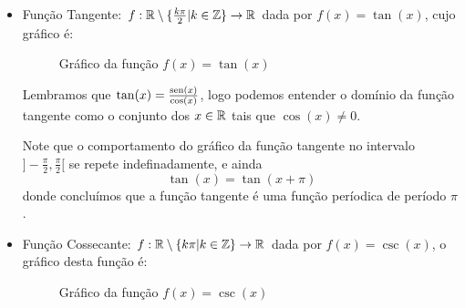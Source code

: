 \begin{itemize}
  \item Função Tangente: $f: \mathbb{R} \setminus \{\frac{k\pi}{2} | k \in \mathbb{Z}\} \rightarrow \mathbb{R}$ dada por $f(x)= \tan(x)$, cujo gráfico é:

  \begin{figure}[H]
  \centering
    \caption{Gráfico da função $f(x)= \tan (x)$}
  \end{figure}

  Lembramos que $\tan(x)= \frac{\operatorname{sen}(x)}{\cos(x)}$, logo podemos entender o domínio da função tangente como o conjunto dos $x \in \mathbb{R}$ tais que $\cos(x) \neq 0$.

  Note que o comportamento do gráfico da função tangente no intervalo $]-\frac{\pi}{2}, \frac{\pi}{2}[$ se repete indefinadamente, e ainda
\begin{equation}
\tan(x)= \tan(x + \pi)
\end{equation}
  donde concluímos que a função tangente é uma função períodica de período $\pi$.

  \item Função Cossecante: $f: \mathbb{R} \setminus \{ k\pi | k \in \mathbb{Z}\} \rightarrow \mathbb{R}$ dada por $f(x)= \csc(x)$, o gráfico desta função é:

  \begin{figure}[H]
  \centering
    \caption{Gráfico da função $f(x)= \csc(x)$}
  \end{figure}


\end{itemize}

